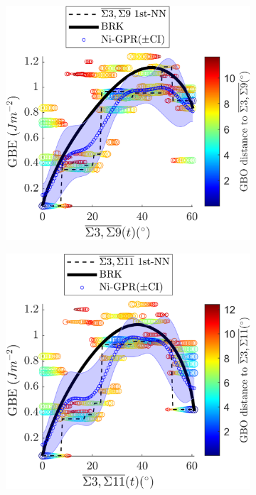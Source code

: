 \documentclass[final,twocolumn,12pt]{elsarticle}
\begin{document}
\begin{figure}[!htb]
		\begin{subfigure}[b]{0.4\textwidth}
			\includegraphics[width=\textwidth]{figures/tunnel-3-9-olmsted.png}
			\caption{}
			\label{fig:tunnel-3-9-olmsted}
		\end{subfigure}
		\begin{subfigure}[b]{0.4\textwidth}
			\includegraphics[width=\textwidth]{figures/tunnel-3-11-olmsted.png}

\end{subfigure}
\end{figure}
\end{document}
